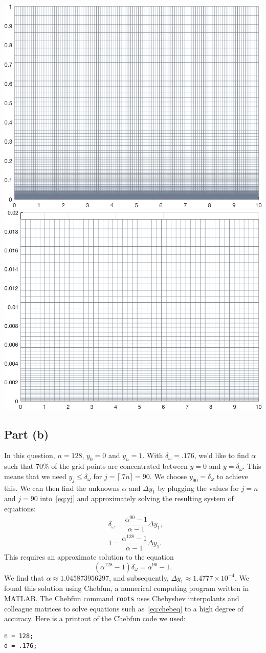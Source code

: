 \documentclass{article}
\begin{document}
\begin{itemize}
\includegraphics[width=.45\textwidth]{meshgrid.jpg} 
\includegraphics[width=.45\textwidth]{meshgrid_small.jpg} 

\subsection{Part (b)}
In this question, $n = 128$, $y_0 = 0$ and $y_n=1$. With $\delta_\omega = .176$, we'd like to find $\alpha$ such that $70\%$ of the grid points are concentrated between $y=0$ and $y=\delta_\omega$.  
This means that we need $y_j \leq \delta_\omega$ for $j = \lceil.7n \rceil =  90$. We choose $y_{90} = \delta_\omega$ to achieve this. We can then find the unknowns $\alpha$ and $\Delta y_1$ by plugging the values for $j = n$ and $j = 90$ into~\eqref{eq:yj} and approximately solving the resulting system of equations:
\begin{align}
& \delta_\omega = \dfrac{\alpha^{90}-1}{\alpha -1} \Delta y_1 ,\\
&  1 = \dfrac{\alpha^{128}-1}{\alpha -1} \Delta y_1 .
\end{align}
This requires an approximate solution to the equation
\begin{equation} 
\label{eq:chebeq}
(\alpha^{128} -1) \delta_\omega = \alpha^{90}-1.
\end{equation}
We find that $\alpha \approx 1.045873956297$, and subsequently, $\Delta y_1 \approx 1.4777 \times 10^{-4}$. 
We found this solution using Chebfun, a numerical computing program written in MATLAB. The Chebfun command {\tt roots} uses Chebyshev interpolants and colleague matrices to solve equations such as~\eqref{eq:chebeq} to a high degree of accuracy. Here is a printout of the Chebfun code we used: 
\begin{verbatim}
n = 128; 
d = .176;


\end{verbatim}
\end{itemize}
\end{document}
